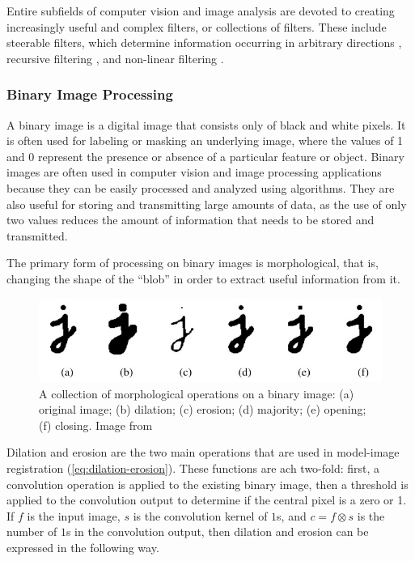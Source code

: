 Entire subfields of computer vision and image analysis are devoted to creating increasingly useful and complex filters, or collections of filters. These include steerable filters, which determine information occurring in arbitrary directions \cite{freemanSteerableFiltersLocal1992}, recursive filtering \cite{nielsenRegularizationScalespaceEdge1996}, and non-linear filtering \cite{tomasiBilateralFilteringGray1998}.

\subsubsection{Binary Image Processing}
\label{sec:binary-img-proc}

A binary image is a digital image that consists only of black and white pixels. It is often used for labeling or masking an underlying image, where the values of 1 and 0 represent the presence or absence of a particular feature or object. Binary images are often used in computer vision and image processing applications because they can be easily processed and analyzed using algorithms. They are also useful for storing and transmitting large amounts of data, as the use of only two values reduces the amount of information that needs to be stored and transmitted.

The primary form of processing on binary images is morphological, that is, changing the shape of the ``blob'' in order to extract useful information from it.

\begin{figure}[h!]
    \includegraphics[width = \linewidth]{figs/background/png/binary-image-processing.jpg}
    \caption{A collection of morphological operations on a binary image: (a) original image; (b) dilation; (c) erosion; (d) majority; (e) opening; (f) closing. Image from \cite{szeliskiComputerVisionAlgorithms2022}}
    \label{fig:binary-image-processing}
\end{figure}

Dilation and erosion are the two main operations that are used in model-image registration (\ref{eq:dilation-erosion}). These functions are ach two-fold: first, a convolution operation is applied to the existing binary image, then a threshold is applied to the convolution output to determine if the central pixel is a zero or 1. If $f$ is the input image, $s$ is the convolution kernel of $1$s, and $c=f\otimes s$ is the number of $1$s in the convolution output, then dilation and erosion can be expressed in the following way.

